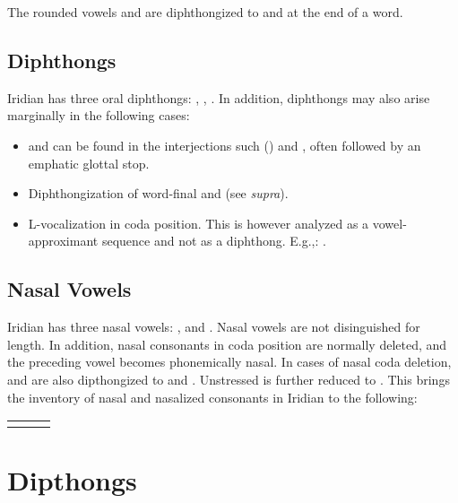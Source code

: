 The rounded vowels  and \bt{\oe~\o:} are diphthongized to  and  at the end of a word.

\subsection{Diphthongs}
Iridian has three oral diphthongs:  ,  \nt{\dte},  \nt{\dto}. In addition, diphthongs may also arise marginally in the following cases:
\begin{itemize}
	\item {} and  can be found in the interjections such   () and   , often followed by an emphatic glottal stop.
	\item Diphthongization of word-final  and \nt{\oe~\o:} (see \textit{supra}).
	\item L-vocalization in coda position. This is however analyzed as a vowel-approximant sequence and not as a diphthong. E.g.,:   .
\end{itemize}

\subsection{Nasal Vowels}
Iridian has three nasal vowels:  ,   and  . Nasal vowels are not disinguished for length. In addition, nasal consonants in coda position are normally deleted, and the preceding vowel becomes phonemically nasal. In cases of nasal coda deletion,   and   are also dipthongized to  and . Unstressed  is further reduced to . This brings the inventory of nasal and nasalized consonants in Iridian to the following: 

\begin{table}[h!]
	\centering \small
	\begin{tabularx}{0.8\textwidth}{>{\bfseries}YYY}
				&  & \\
	\end{tabularx}
\end{table}

\section{Dipthongs}

